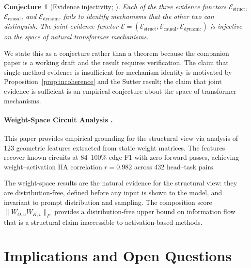 \documentclass[11pt]{article}
\newtheorem{conjecture}{Conjecture}[section]
\theoremstyle{remark}
\begin{document}
\begin{conjecture}[Evidence injectivity; \citealt{tower2026geom}]\label{conj:injectivity}
Each of the three evidence functors $\mathcal{E}_{\mathrm{struct}}$,
$\mathcal{E}_{\mathrm{causal}}$, and $\mathcal{E}_{\mathrm{dynamic}}$
fails to identify mechanisms that the other two can distinguish.  The
joint evidence functor $\mathcal{E} = (\mathcal{E}_{\mathrm{struct}},
\mathcal{E}_{\mathrm{causal}}, \mathcal{E}_{\mathrm{dynamic}})$ is
injective on the space of natural transformer mechanisms.
\end{conjecture}

We state this as a conjecture rather than a theorem because the
companion paper is a working draft and the result requires verification.
The claim that single-method evidence is insufficient for mechanism
identity is motivated by Proposition~\ref{prop:incoherence} and the
Sutter result; the claim that joint evidence is sufficient is an
empirical conjecture about the space of transformer mechanisms.

\paragraph{Weight-Space Circuit Analysis \citep{tower2026weight}.}
This paper provides empirical grounding for the structural view via
analysis of 123 geometric features extracted from static weight matrices.
The features recover known circuits at 84--100\% edge F1 with zero
forward passes, achieving weight--activation IIA correlation $r = 0.982$
across 432 head--task pairs.

The weight-space results are the natural evidence for the structural
view: they are distribution-free, defined before any input is shown
to the model, and invariant to prompt distribution and sampling.
The composition score $\|W_{O,u} W_{K,v}\|_F$ provides a distribution-free
upper bound on information flow that is a structural claim inaccessible
to activation-based methods.

\section{Implications and Open Questions}\label{sec:implications}
\end{document}
